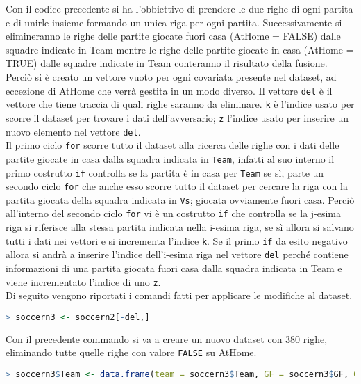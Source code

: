 Con il codice precedente si ha l'obbiettivo di prendere le due righe di ogni partita e di unirle insieme formando un unica riga per ogni partita. Successivamente si elimineranno le righe delle partite giocate fuori casa (\textsf{AtHome} = FALSE) dalle squadre indicate in \textsf{Team} mentre le righe delle partite giocate in casa (\textsf{AtHome} = TRUE) dalle squadre indicate in \textsf{Team} conteranno il risultato della fusione.\\
Perciò si è creato un vettore vuoto per ogni covariata presente nel dataset, ad eccezione di \textsf{AtHome} che verrà gestita in un modo diverso. Il vettore \texttt{del} è il vettore che tiene traccia di quali righe saranno da eliminare. \texttt{k} è l'indice usato per scorre il dataset per trovare i dati dell'avversario; \texttt{z} l'indice usato per inserire un nuovo elemento nel vettore \texttt{del}.\\
Il primo ciclo \texttt{for} scorre tutto il dataset alla ricerca delle righe con i dati delle partite giocate in casa dalla squadra indicata in \texttt{Team}, infatti al suo interno il primo costrutto \texttt{if} controlla se la partita è in casa per \texttt{Team} se sì, parte un secondo ciclo \texttt{for} che anche esso scorre tutto il dataset per cercare la riga con la partita giocata della squadra indicata in \texttt{Vs}; giocata ovviamente fuori casa. Perciò all'interno del secondo ciclo \texttt{for} vi è un costrutto \texttt{if} che controlla se la j-esima riga si riferisce alla stessa partita indicata nella i-esima riga, se sì allora si salvano tutti i dati nei vettori e si incrementa l'indice \texttt{k}. Se il primo \texttt{if} da esito negativo allora si andrà a inserire l'indice dell'i-esima riga nel vettore \texttt{del} perché contiene informazioni di una partita giocata fuori casa dalla squadra indicata in \textsf{Team} e viene incrementato l'indice di uno \texttt{z}.\\

Di seguito vengono riportati i comandi fatti per applicare le modifiche al dataset.
\bigskip
\begin{lstlisting}[language=R]
> soccern3 <- soccern2[-del,]
\end{lstlisting}
\bigskip
\bigskip
Con il precedente commando si va a creare un nuovo dataset con 380 righe, eliminando tutte quelle righe con valore \texttt{FALSE} su \textsf{AtHome}. 
\bigskip
\begin{lstlisting}[language=R]
> soccern3$Team <- data.frame(team = soccern3$Team, GF = soccern3$GF, GA = soccern3$GA,  at.home = 1, Poss = soccern3$Poss, Sh = soccern3$Sh, SoT = soccern3$SoT, G.Sh = soccern3$G.Sh, PAtt = soccern3$PAtt, PCmp. = soccern3$PCmp., SPAtt = soccern3$SPAtt, SPCmp. = soccern3$SPCmp., MPAtt = soccern3$MPAtt, MPCmp. = soccern3$MPCmp., LPAtt = soccern3$LPAtt, LPCmp. = soccern3$LPCmp., ToDef3rd = soccern3$ToDef3rd, ToAtt3rd = soccern3$ToAtt3rd, ToAttPen = soccern3$ToAttPen, TotDist = soccern3$TotDist, Fls = soccern3$Fls, Fld = soccern3$Fld, Crs = soccern3$Crs, Int = soccern3$Int, TklWin = soccern3$TklWin, Recov = soccern3$Recov)
	
\end{lstlisting}

